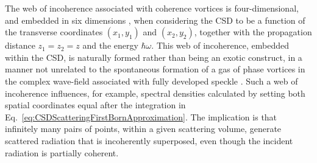 \documentclass[%
 reprint,
 amsmath,amssymb,
 aps,
]{revtex4-1}
\begin{document}
The web of incoherence associated with coherence vortices is four-dimensional, and embedded in six dimensions \cite{Marasinghe2010}, when considering the CSD to be a function of the transverse coordinates $(x_1,y_1)$ and $(x_2,y_2)$, together with the propagation distance $z_1=z_2=z$ and the energy $\hbar\omega$.  This web of incoherence, embedded within the CSD, is naturally formed rather than being an exotic construct, in a manner not unrelated to the spontaneous formation of a gas of phase vortices in the complex wave-field associated with fully developed speckle \cite{OHolleran2008}.  Such a web of incoherence influences, for example, spectral densities calculated by setting both spatial coordinates equal after the integration in Eq.~\ref{eq:CSDScatteringFirstBornApproximation}.  The implication is that infinitely many pairs of points, within a given scattering volume, generate scattered radiation that is incoherently superposed, even though the incident radiation is partially coherent.


\end{document}
